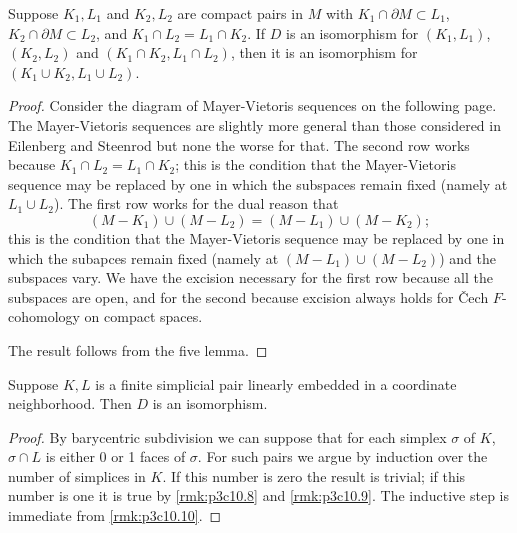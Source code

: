 \documentclass[../main]{subfiles}
\begin{document}
\begin{remark}\label{rmk:p3c10.10}
Suppose $K_1,L_1$ and $K_2,L_2$ are compact pairs in $M$ with $K_1 \cap \partial M \subset L_1$, $K_2 \cap \partial M \subset L_2$, and $K_1 \cap L_2 = L_1 \cap K_2$. If $D$ is an isomorphism for $(K_1,L_1)$, $(K_2,L_2)$ and $(K_1\cap K_2,L_1 \cap L_2)$, then it is an isomorphism for $(K_1 \cup K_2, L_1 \cup L_2)$.
\end{remark}
\begin{proof}
Consider the diagram of Mayer-Vietoris sequences on the following page. The Mayer-Vietoris sequences are slightly more general than those considered in Eilenberg and Steenrod but none the worse for that. The second row works because $K_1 \cap L_2 = L_1 \cap K_2$; this is the condition that the Mayer-Vietoris sequence may be replaced by one in which the subspaces remain fixed (namely at $L_1 \cup L_2$). The first row works for the dual reason that
\[(M-K_1) \cup (M-L_2) = (M-L_1) \cup (M-K_2);\]
this is the condition that the Mayer-Vietoris sequence may be replaced by one in which the subapces remain fixed (namely at $(M-L_1) \cup (M-L_2)$) and the subspaces vary. We have the excision necessary for the first row because all the subspaces are open, and for the second because excision always holds for \v{C}ech $F$-cohomology on compact spaces.

The result follows from the five lemma.
\end{proof}
\begin{remark}\label{rmk:p3c10.11}
Suppose $K,L$ is a finite simplicial pair linearly embedded in a coordinate neighborhood. Then $D$ is an isomorphism.
\end{remark}
\begin{proof}
By barycentric subdivision we can suppose that for each simplex $\sigma$ of $K$, $\sigma \cap L$ is either 0 or 1 faces of $\sigma$. For such pairs we argue by induction over the number of simplices in $K$. If this number is zero the result is trivial; if this number is one it is true by \ref{rmk:p3c10.8} and \ref{rmk:p3c10.9}. The inductive step is immediate from \ref{rmk:p3c10.10}.
\end{proof}
\end{document}
